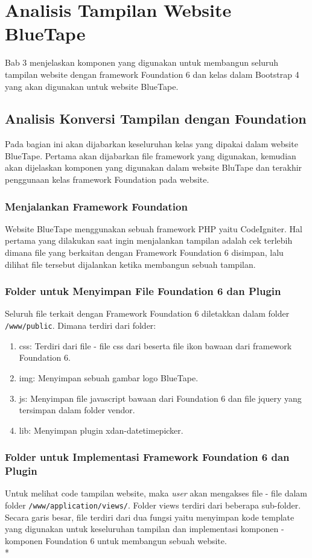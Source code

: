 \chapter{Analisis Tampilan Website BlueTape}
Bab 3 menjelaskan komponen yang digunakan untuk membangun seluruh tampilan website dengan framework Foundation 6 dan kelas dalam Bootstrap 4 yang akan digunakan untuk website BlueTape.
\section{Analisis Konversi Tampilan dengan Foundation}
Pada bagian ini akan dijabarkan keseluruhan kelas yang dipakai dalam website BlueTape. Pertama akan dijabarkan file framework yang digunakan, kemudian akan dijelaskan komponen yang digunakan dalam website BluTape dan terakhir penggunaan kelas framework Foundation pada website.
\subsection{Menjalankan Framework Foundation}
Website BlueTape menggunakan sebuah framework PHP yaitu CodeIgniter. Hal pertama yang dilakukan saat ingin menjalankan tampilan adalah cek terlebih dimana file yang berkaitan dengan Framework Foundation 6 disimpan, lalu dilihat file tersebut dijalankan ketika membangun sebuah tampilan. 
\subsection{Folder untuk Menyimpan File Foundation 6 dan Plugin}
Seluruh file terkait dengan Framework Foundation 6 diletakkan dalam folder \texttt{/www/public}. Dimana terdiri dari folder:
\begin{enumerate}
	\item css: Terdiri dari file - file css dari beserta file ikon bawaan dari framework Foundation 6. 
	\item img: Menyimpan sebuah gambar logo BlueTape. 
	\item js: Menyimpan file javascript bawaan dari Foundation 6 dan file jquery yang tersimpan dalam folder vendor.
	\item lib: Menyimpan plugin xdan-datetimepicker.
\end{enumerate}


\subsection{Folder untuk Implementasi Framework Foundation 6 dan Plugin}
Untuk melihat code tampilan website, maka \textit{user} akan mengakses file - file dalam folder \texttt{/www/application/views/}. Folder views terdiri dari beberapa sub-folder. Secara garis besar, file terdiri dari dua fungsi yaitu menyimpan kode template yang digunakan untuk keseluruhan tampilan dan implementasi komponen - komponen Foundation 6 untuk membangun sebuah website. \\*

